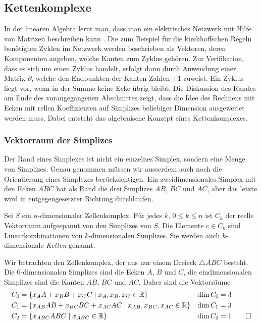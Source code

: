 \subsection{Kettenkomplexe
\label{buch:topologie:subsection:kettenkomplexe}}
In der linearen Algebra lernt man, dass man ein elektrisches
Netzwerk mit Hilfe von Matrizen beschreiben kann
\cite[Abschnitt~2.A]{buch:linalg}.
Die zum Beispiel für die kirchhoffschen Regeln benötigten Zyklen
im Netzwerk werden beschrieben als Vektoren, deren Komponenten angeben,
welche Kanten zum Zyklus gehören.
Zur Verifikation, dass es sich um einen Zyklus handelt, erfolgt dann
durch Anwendung einer Matrix $\partial$, welche den Endpunkten der
Kanten Zahlen $\pm 1$ zuweist.
Ein Zyklus liegt vor, wenn in der Summe keine Ecke übrig bleibt.
Die Diskussion des Randes am Ende des vorangegangenen Abschnittes
zeigt, dass die Idee des Rechnens mit Ecken mit rellen Koeffizienten 
auf Simplizes beliebiger Dimension ausgeweitet werden muss.
Dabei entsteht das algebraische Konzept eines Kettenkomplexes.

%
%
\subsubsection{Vektorraum der Simplizes}
Der Rand eines Simplexes ist nicht ein einzelnes Simplex, sondern
eine Menge von Simplizes.
Genau genommen müssen wir ausserdem auch noch die Orientierung eines
Simplexes berücksichtigen.
Ein zweidimensionales Simplex mit den Ecken $ABC$ hat als Rand
die drei Simplizes $AB$, $BC$ und $AC$, aber das letzte wird in
entgegengesetzter Richtung durchlaufen.

\begin{definition}
Sei $S$ ein $n$-dimensionaler Zellenkomplex.
Für jedes $k$, $0\le k\le n$ ist $C_k$ der reelle Vektorraum aufgespannt
von den Simplizes von $S$.
Die Elemente $c\in C_k$ sind Linearkombinationen von $k$-dimensionalen
Simplizes.
Sie werden auch $k$-dimensionale \emph{Ketten} genannt.
%
\end{definition}

\begin{beispiel}
\label{buch:topologie:eulercharakteristik:bsp:dreieck}
Wir betrachten den Zellenkomplex, der aus nur einem Dreieck
$\triangle ABC$ besteht.
Die $0$-dimensionalen Simplizes sind die Ecken $A$, $B$ und $C$, 
die eindimensionalen Simplizes sind die Kanten $AB$, $BC$ und $AC$.
Daher sind die Vektorräume
\begin{align*}
C_0 &= \{ x_A A + x_B B + x_C C\mid x_A, x_B, x_C\in\mathbb{R}\}
&
\dim C_0 &= 3
\\
C_1 &= \{ x_{AB} AB + x_{BC} BC + x_{AC} AC\mid x_{AB}, x_{BC}, x_{AC} \in\mathbb{R}\}
&
\dim C_1 &= 3
\\
C_2 &= \{ x_{ABC} ABC\mid x_{ABC}\in\mathbb{R}\}
&
\dim C_2 &= 1
\qedhere
\end{align*}
\end{beispiel}

